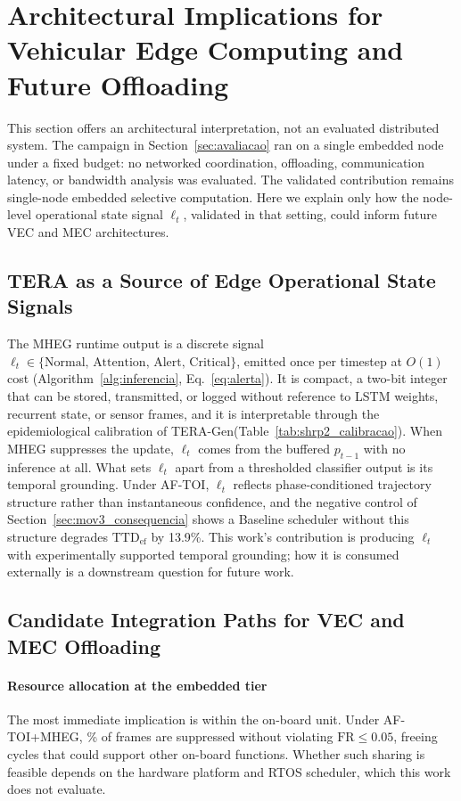 \documentclass[a4paper,fleqn]{cas-dc}
\newcommand{\TERAGen}{\mbox{TERA-Gen}\xspace}
\newcommand{\AFTOI}{\mbox{AF-TOI}\xspace}
\newcommand{\MHEG}{\mbox{MHEG}\xspace}
\begin{document}
\section{Architectural Implications for Vehicular Edge Computing and Future Offloading}
\label{sec:vecmec}
This section offers an architectural interpretation, not an evaluated
distributed system. The campaign in Section~\ref{sec:avaliacao} ran on a single
embedded node under a fixed budget: no networked coordination, offloading,
communication latency, or bandwidth analysis was evaluated. The validated
contribution remains single-node embedded selective computation. Here we explain
only how the node-level operational state signal $\ell_t$, validated in that
setting, could inform future VEC and MEC architectures.
\subsection{TERA as a Source of Edge Operational State Signals}
\label{sec:tera_opsignal}
The \MHEG runtime output is a discrete signal
$\ell_t \in \{\text{Normal},\, \text{Attention},\, \text{Alert},\,
\text{Critical}\}$, emitted once per timestep at $O(1)$ cost
(Algorithm~\ref{alg:inferencia}, Eq.~\ref{eq:alerta}). It is compact, a two-bit
integer that can be stored, transmitted, or logged without reference to LSTM
weights, recurrent state, or sensor frames, and it is interpretable through the
epidemiological calibration of \TERAGen (Table~\ref{tab:shrp2_calibracao}). When
\MHEG suppresses the update, $\ell_t$ comes from the buffered $p_{t-1}$ with no
inference at all.
What sets $\ell_t$ apart from a thresholded classifier output is its temporal
grounding. Under \AFTOI, $\ell_t$ reflects phase-conditioned trajectory
structure rather than instantaneous confidence, and the negative control of
Section~\ref{sec:mov3_consequencia} shows a Baseline scheduler without this
structure degrades $\mathrm{TTD}_{\mathrm{ef}}$ by {\color{\revcolor}13.9\%}. This work's
contribution is producing $\ell_t$ with experimentally supported temporal
grounding; how it is consumed externally is a downstream question for future
work.
\subsection{Candidate Integration Paths for VEC and MEC Offloading}
\label{sec:vecmec_implications}
\paragraph{Resource allocation at the embedded tier}
The most immediate implication is within the on-board unit. Under \mbox{AF-TOI}+MHEG,
{\color{\revcolor}\SkipRate\%} of frames are suppressed without violating $\mathrm{FR} \le 0.05$,
freeing cycles that could support other on-board functions. Whether such sharing
is feasible depends on the hardware platform and RTOS scheduler, which this work
does not evaluate.
\end{document}
